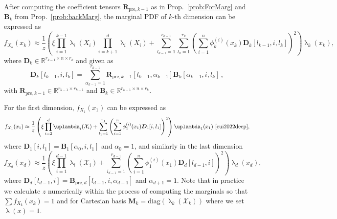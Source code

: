 After computing the coefficient tensors $\bm{R}_{\text{pre},k-1}$ as in Prop.~\ref{prob:ForMarg} and $\bm{B}_{k}$ from Prop.~\ref{prob:backMarg}, the marginal PDF of $k$-th dimension can be expressed as
\begin{equation}
	f_{X_k}(x_k)  \approx \frac{1}{z} \left(\xi \prod_{i=1}^{k-1} \uplambda_i(X_i) \prod_{i=k+1}^{d} \uplambda_i(X_i) + \sum_{l_{k-1}=1}^{r_{k-1}} \sum_{l_k=1}^{r_k} \left(\sum_{i=1}^{n} \phi^{(i)}_k(x_k) \bm{D}_k[l_{k-1},i, l_k] \right)^2 \right) \uplambda_k(x_k), \label{eq:MargTT}
\end{equation}
where $\bm{D}_k \in \mathbb{R}^{r_{k-1} \times n \times r_k}$ and given as
\begin{equation}
	\bm{D}_k[l_{k-1},i,l_k] = \sum_{\alpha_{k-1}=1}^{r_{k-1}}  \bm{R}_{\text{pre},k-1}[l_{k-1}, \alpha_{k-1}] \bm{B}_k[\alpha_{k-1}, i, l_k] \, ,
\end{equation}
with $\bm{R}_{\text{pre},k-1}\in \mathbb{R}^{r_{k-1} \times r_{k-1}}$ and $\bm{B}_k \in \mathbb{R}^{r_{k-1} \times n \times r_k}$.

For the first dimension, $f_{X_1}(x_1)$ can be expressed as
\begin{equation}
	f_{X_1}(x_1)  \approx \frac{1}{z} \left(\xi \prod_{i=2}^{d} \uplambda_i(\mathcal{X}_i) + \sum_{l_1=1}^{r_1} \left(\sum_{i=1}^{n} \phi^{(i)}_1(x_1) \bm{D}_1[i, l_1] \right)^2 \right) \uplambda_1(x_1)\, \,  \text{\cite[Eq. 30]{cui2022deep}},
	\label{eq:firstMarg}
\end{equation}
where $\bm{D}_1[i, l_1] = \bm{B}_1[\alpha_0, i, l_1]$ and $\alpha_0 = 1$,
and similarly in the last dimension
\begin{equation}
	f_{X_d}(x_d)  \approx \frac{1}{z} \left(\xi \prod_{i=1}^{d-1} \uplambda_i(\mathcal{X}_i) + \sum_{l_{d-1}=1}^{r_{d-1}} \left(\sum_{i=1}^{n} \phi^{(i)}_1(x_1) \bm{D}_d[l_{d-1},i] \right)^2 \right) \uplambda_d(x_d),
\end{equation}
where $\bm{D}_d[l_{d-1},i] = \bm{B}_{\text{pre},d}[l_{d-1}, i, \alpha_{d+1}]$ and $\alpha_{d+1} = 1$.
Note that in practice we calculate $z$ numerically within the process of computing the marginals so that  $\sum f_{X_k}(x_k) =1 $ and for Cartesian basis $\bm{M}_k = \text{diag}(\uplambda_k(\mathcal{X}_k))$ where we set $\uplambda(x) = 1$.

